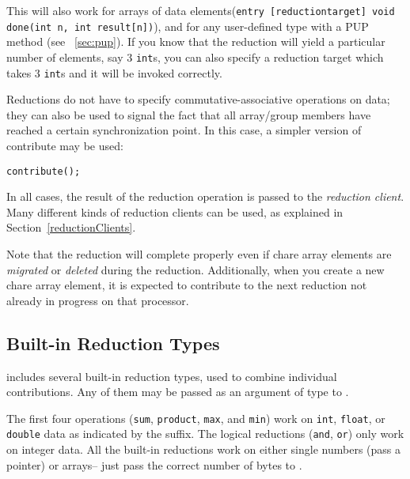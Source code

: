 This will also work for arrays of data 
elements({\tt entry [reductiontarget] void done(int n, int result[n])}), 
and for any user-defined type with a PUP method
(see ~\ref{sec:pup}). If you know that the reduction will yield a particular
number of elements, say 3 {\tt int}s, you can also specify a reduction target which
takes 3 {\tt int}s and it will be invoked correctly. 

Reductions do not have to specify commutative-associative operations on data;
they can also be used to signal the fact that all array/group members
have reached a certain synchronization point. In this case, a simpler version
of contribute may be used:


\begin{alltt}
    contribute();
\end{alltt}

In all cases, the result of the reduction operation is passed to the {\em reduction
client}.  Many different kinds of reduction clients can be used, as
explained in Section~\ref{reductionClients}.

Note that the reduction will complete properly even if chare array elements are {\em migrated}
or {\em deleted} during the reduction. Additionally, when you create a new chare array element, 
it is expected to contribute to the next reduction not already in progress on that
processor. 

\subsection{Built-in Reduction Types}
\label{builtin_reduction}

\charmpp{} includes several built-in reduction types, used to combine 
individual contributions.  Any of them may be passed as an argument of type
 to .

The first four operations ({\tt sum}, {\tt product}, {\tt max}, and {\tt min}) work on {\tt int},
{\tt float}, or {\tt double} data as indicated by the suffix.  The logical
reductions ({\tt and}, {\tt or}) only work on integer data.  All the built-in
reductions work on either single numbers (pass a pointer) or arrays-- just
pass the correct number of bytes to .

